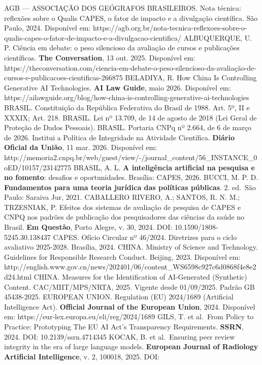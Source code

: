 \documentclass[
  12pt,
  a4paper,
  brazil
]{article}
\begin{document}
AGB --- ASSOCIAÇÃO DOS GEÓGRAFOS BRASILEIROS. Nota técnica: reflexões
sobre o Qualis CAPES, o fator de impacto e a divulgação científica. São
Paulo, 2024. Disponível em:
https://agb.org.br/nota-tecnica-reflexoes-sobre-o-qualis-capes-o-fator-de-impacto-e-a-divulgacao-cientifica/
ALBUQUERQUE, U. P. Ciência em debate: o peso silencioso da avaliação de
cursos e publicações científicas. \textbf{The Conversation}, 13 out.
2025. Disponível em:
https://theconversation.com/ciencia-em-debate-o-peso-silencioso-da-avaliação-de-cursos-e-publicacoes-cientificas-266875
BELADIYA, R. How China Is Controlling Generative AI Technologies.
\textbf{AI Law Guide}, maio 2026. Disponível em:
https://ailawguide.org/blog/how-china-is-controlling-generative-ai-technologies
BRASIL. Constituição da República Federativa do Brasil de 1988. Art. 5º,
II e XXXIX; Art. 218. BRASIL. Lei nº 13.709, de 14 de agosto de 2018
(Lei Geral de Proteção de Dados Pessoais). BRASIL. Portaria CNPq nº
2.664, de 6 de março de 2026. Institui a Política de Integridade na
Atividade Científica. \textbf{Diário Oficial da União}, 11 mar. 2026.
Disponível em:
http://memoria2.cnpq.br/web/guest/view/-/journal\_content/56\_INSTANCE\_0oED/10157/23142775
BRASIL, A. L. \textbf{A inteligência artificial na pesquisa e no
fomento}: desafios e oportunidades. Brasília: CAPES, 2026. BUCCI, M. P.
D. \textbf{Fundamentos para uma teoria jurídica das políticas públicas}.
2. ed.~São Paulo: Saraiva Jur, 2021. CABALLERO RIVERO, A.; SANTOS, R. N.
M.; TRZESNIAK, P. Efeitos dos sistemas de avaliação de pesquisa de CAPES
e CNPQ nos padrões de publicação dos pesquisadores das ciências da saúde
no Brasil. \textbf{Em Questão}, Porto Alegre, v. 30, 2024. DOI:
10.1590/1808-5245.30.138437 CAPES. Ofício Circular nº 46/2024.
Diretrizes para o ciclo avaliativo 2025-2028. Brasília, 2024. CHINA.
Ministry of Science and Technology. Guidelines for Responsible Research
Conduct. Beijing, 2023. Disponível em:
http://english.www.gov.cn/news/202401/06/content\_WS6598c927c6d0868f4e8e2d24.html
CHINA. Measures for the Identification of AI-Generated (Synthetic)
Content. CAC/MIIT/MPS/NRTA, 2025. Vigente desde 01/09/2025. Padrão GB
45438-2025. EUROPEAN UNION. Regulation (EU) 2024/1689 (Artificial
Intelligence Act). \textbf{Official Journal of the European Union},
2024. Disponível em: https://eur-lex.europa.eu/eli/reg/2024/1689 GILS,
T. et al.~From Policy to Practice: Prototyping The EU AI Act's
Transparency Requirements. \textbf{SSRN}, 2024. DOI:
10.2139/ssrn.4714345 KOCAK, B. et al.~Ensuring peer review integrity in
the era of large language models. \textbf{European Journal of Radiology
Artificial Intelligence}, v. 2, 100018, 2025. DOI:
\end{document}
